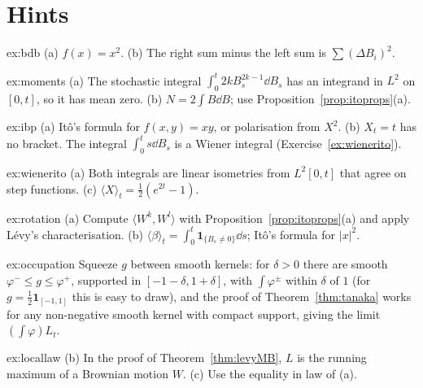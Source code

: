 \section{Hints}

\begin{hint}{ex:bdb}
(a) $f(x)=x^2$. (b) The right sum minus the left sum is $\sum(\Delta B_i)^2$.
\end{hint}

\begin{hint}{ex:moments}
(a) The stochastic integral $\int_0^t2kB_s^{2k-1}\dd B_s$ has an integrand in $L^2$ on $[0,t]$, so it has mean zero. (b) $N=2\int B\dd B$; use Proposition~\ref{prop:itoprops}(a).
\end{hint}

\begin{hint}{ex:ibp}
(a) It\^o's formula for $f(x,y)=xy$, or polarisation from $X^2$. (b) $X_t=t$ has no bracket. The integral $\int_0^ts\dd B_s$ is a Wiener integral (Exercise~\ref{ex:wienerito}).
\end{hint}

\begin{hint}{ex:wienerito}
(a) Both integrals are linear isometries from $L^2[0,t]$ that agree on step functions. (c) $\langle X\rangle_t=\frac12(e^{2t}-1)$.
\end{hint}

\begin{hint}{ex:rotation}
(a) Compute $\langle W^k,W^l\rangle$ with Proposition~\ref{prop:itoprops}(a) and apply L\'evy's characterisation. (b) $\langle\beta\rangle_t=\int_0^t\mathbf 1_{\{B_s\ne0\}}\dd s$; It\^o's formula for $|x|^2$.
\end{hint}

\begin{hint}{ex:occupation}
Squeeze $g$ between smooth kernels: for $\delta>0$ there are smooth $\varphi^-\le g\le\varphi^+$, supported in $[-1-\delta,1+\delta]$, with $\int\varphi^\pm$ within $\delta$ of $1$ (for $g=\frac12\mathbf 1_{[-1,1]}$ this is easy to draw), and the proof of
Theorem~\ref{thm:tanaka} works for any non-negative smooth kernel with compact support, giving the limit $(\int\varphi)L_t$.
\end{hint}

\begin{hint}{ex:locallaw}
(b) In the proof of Theorem~\ref{thm:levyMB}, $L$ is the running maximum of a Brownian motion $W$. (c) Use the equality in law of (a).
\end{hint}

